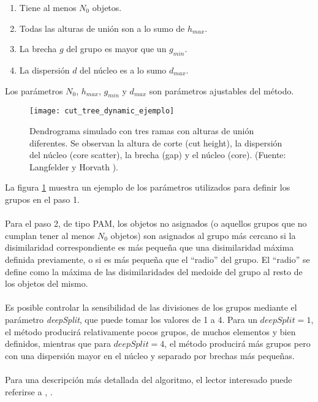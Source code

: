 \begin{enumerate}
\item Tiene al menos $N_0$ objetos.
\item Todas las alturas de unión son a lo sumo de $h_{max}$.
\item La brecha $g$ del grupo es mayor que un $g_{min}$.
\item La dispersión $d$ del núcleo es a lo sumo $d_{max}$.
\end{enumerate}
Los parámetros $N_0$, $h_{max}$, $g_{min}$ y $d_{max}$ son parámetros ajustables del método.
\begin{figure}[h]
    \centering
    \texttt{[image: cut\_tree\_dynamic\_ejemplo]}
    \caption{Dendrograma simulado con tres ramas con alturas de unión diferentes. Se observan la altura de corte (cut height), la dispersión del núcleo (core scatter), la brecha (gap) y el núcleo (core). (Fuente: Langfelder y Horvath \cite{Langfelder2008}).}
    \label{fig:cut_tree_dynamic_ejemplo}
\end{figure}
La figura \ref{fig:cut_tree_dynamic_ejemplo} muestra un ejemplo de los parámetros utilizados para definir los grupos en el paso 1.\\\\
Para el paso 2, de tipo PAM, los objetos no asignados (o aquellos grupos que no cumplan tener al menos $N_0$ objetos) son asignados al grupo más cercano si la disimilaridad correspondiente es más pequeña que una disimilaridad máxima definida previamente, o si es más pequeña que el ``radio'' del grupo. El ``radio'' se define como la máxima de las disimilaridades del medoide del grupo al resto de los objetos del mismo.\\\\
Es posible controlar la sensibilidad de las divisiones de los grupos mediante el parámetro \textit{deepSplit}, que puede tomar los valores de 1 a 4. Para un $deepSplit=1$, el método producirá relativamente pocos grupos, de muchos elementos y bien definidos, mientras que para $deepSplit=4$, el método producirá más grupos pero con una dispersión mayor en el núcleo y separado por brechas más pequeñas.\\\\
Para una descripción más detallada del algoritmo, el lector interesado puede referirse a \cite{Langfelder2008}, \cite{Langfelder2007}.


